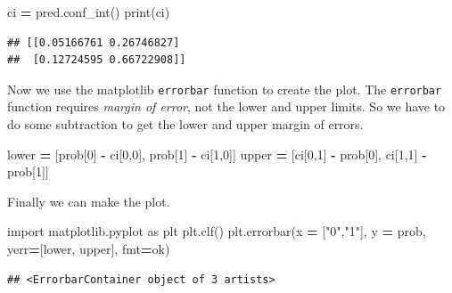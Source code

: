 \documentclass[
]{book}
\newenvironment{Shaded}{\begin{snugshade}}{\end{snugshade}}
\newcommand{\BuiltInTok}[1]{#1}
\newcommand{\DecValTok}[1]{\textcolor[rgb]{0.00,0.00,0.81}{#1}}
\newcommand{\ImportTok}[1]{#1}
\newcommand{\NormalTok}[1]{#1}
\newcommand{\OperatorTok}[1]{\textcolor[rgb]{0.81,0.36,0.00}{\textbf{#1}}}
\newcommand{\StringTok}[1]{\textcolor[rgb]{0.31,0.60,0.02}{#1}}
\begin{document}
\begin{Shaded}
\begin{Highlighting}[]
\NormalTok{ci }\OperatorTok{=}\NormalTok{ pred.conf\_int()}
\BuiltInTok{print}\NormalTok{(ci)}
\end{Highlighting}
\end{Shaded}

\begin{verbatim}
## [[0.05166761 0.26746827]
##  [0.12724595 0.66722908]]
\end{verbatim}

Now we use the matplotlib \texttt{errorbar} function to create the plot. The \texttt{errorbar} function requires \emph{margin of error}, not the lower and upper limits. So we have to do some subtraction to get the lower and upper margin of errors.

\begin{Shaded}
\begin{Highlighting}[]
\NormalTok{lower }\OperatorTok{=}\NormalTok{ [prob[}\DecValTok{0}\NormalTok{] }\OperatorTok{{-}}\NormalTok{ ci[}\DecValTok{0}\NormalTok{,}\DecValTok{0}\NormalTok{], prob[}\DecValTok{1}\NormalTok{] }\OperatorTok{{-}}\NormalTok{ ci[}\DecValTok{1}\NormalTok{,}\DecValTok{0}\NormalTok{]]}
\NormalTok{upper }\OperatorTok{=}\NormalTok{ [ci[}\DecValTok{0}\NormalTok{,}\DecValTok{1}\NormalTok{] }\OperatorTok{{-}}\NormalTok{ prob[}\DecValTok{0}\NormalTok{], ci[}\DecValTok{1}\NormalTok{,}\DecValTok{1}\NormalTok{] }\OperatorTok{{-}}\NormalTok{ prob[}\DecValTok{1}\NormalTok{]]}
\end{Highlighting}
\end{Shaded}

Finally we can make the plot.

\begin{Shaded}
\begin{Highlighting}[]
\ImportTok{import}\NormalTok{ matplotlib.pyplot }\ImportTok{as}\NormalTok{ plt}
\NormalTok{plt.clf()}
\NormalTok{plt.errorbar(x }\OperatorTok{=}\NormalTok{ [}\StringTok{"0"}\NormalTok{,}\StringTok{"1"}\NormalTok{], y }\OperatorTok{=}\NormalTok{ prob, }
\NormalTok{             yerr}\OperatorTok{=}\NormalTok{[lower, upper], fmt}\OperatorTok{=}\StringTok{\textquotesingle{}ok\textquotesingle{}}\NormalTok{)}
\end{Highlighting}
\end{Shaded}

\begin{verbatim}
## <ErrorbarContainer object of 3 artists>
\end{verbatim}
\end{document}
